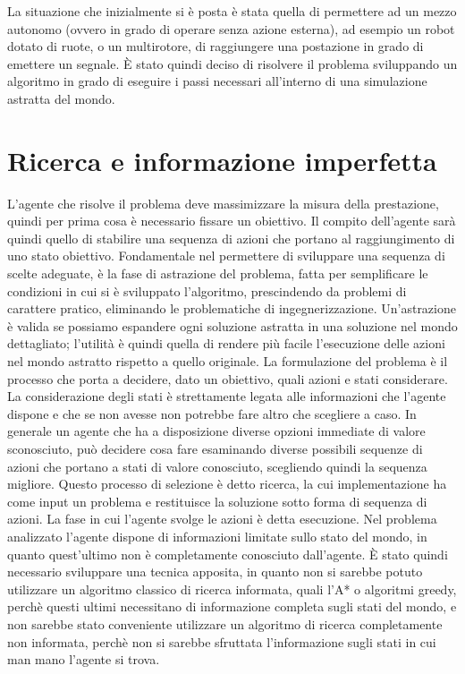 La situazione che inizialmente si è posta è stata quella di permettere ad un mezzo autonomo (ovvero in grado di operare senza azione esterna), ad esempio un robot dotato di ruote, o un multirotore, di raggiungere una postazione in grado di emettere un segnale. È stato quindi deciso di risolvere il problema sviluppando un algoritmo in grado di eseguire i passi necessari all'interno di una simulazione astratta del mondo.




\section{Ricerca e informazione imperfetta}
L'agente che risolve il problema deve massimizzare la misura della prestazione, quindi per prima cosa è necessario fissare un obiettivo. Il compito dell'agente sarà quindi quello di stabilire una sequenza di azioni che portano al raggiungimento di uno stato obiettivo. Fondamentale nel permettere di sviluppare una sequenza di scelte adeguate, è la fase di astrazione del problema, fatta per semplificare le condizioni in cui si è sviluppato l'algoritmo, prescindendo da problemi di carattere pratico, eliminando le problematiche di ingegnerizzazione. Un'astrazione è valida se possiamo espandere ogni soluzione astratta in una soluzione nel mondo dettagliato; l'utilità è quindi quella di rendere più facile l'esecuzione delle azioni nel mondo astratto rispetto a quello originale. 
La formulazione del problema è il processo che porta a decidere, dato un obiettivo, quali azioni e stati considerare. La considerazione degli stati è strettamente legata alle informazioni che l'agente dispone e che se non avesse non potrebbe fare altro che scegliere a caso. In generale un agente che ha a disposizione diverse opzioni immediate di valore sconosciuto, può decidere cosa fare esaminando diverse possibili sequenze di azioni che portano a stati di valore conosciuto, scegliendo quindi la sequenza migliore. Questo processo di selezione è detto ricerca, la cui implementazione ha come input un problema e restituisce la soluzione sotto forma di sequenza di azioni. La fase in cui l'agente svolge le azioni è detta esecuzione.
Nel problema analizzato l'agente dispone di informazioni limitate sullo stato del mondo, in quanto quest'ultimo non è completamente conosciuto dall'agente. È stato quindi necessario sviluppare una tecnica apposita, in quanto non si sarebbe potuto utilizzare un algoritmo classico di ricerca informata, quali l'A* o algoritmi greedy, perchè questi ultimi necessitano di informazione completa sugli stati del mondo, e non sarebbe stato conveniente utilizzare un algoritmo di ricerca completamente non informata, perchè non si sarebbe sfruttata l'informazione sugli stati in cui man mano l'agente si trova.


